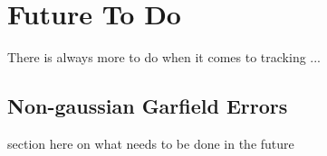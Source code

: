 \section{Future To Do}

	There is always more to do when it comes to tracking ...

	\subsection{Non-gaussian Garfield Errors}


  section here on what needs to be done in the future
